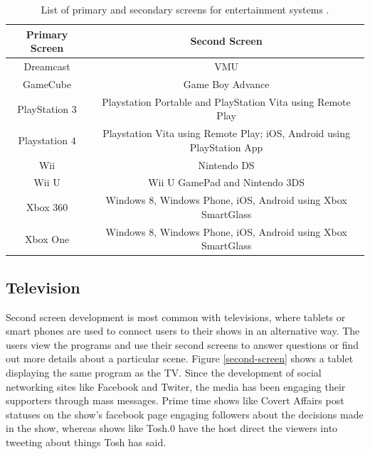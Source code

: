 \documentclass[11pt, oneside]{article}
\begin{document}
\begin{table}[h!]
    \centering
    \caption{List of primary and secondary screens for entertainment systems \cite{wiki_second_screen}.}
    \begin{tabular}{| c | c |}
        \hline
        Primary Screen & Second Screen \\ \hline
        Dreamcast & VMU \\ \hline
        GameCube & Game Boy Advance \\ \hline
        PlayStation 3 & Playstation Portable and PlayStation Vita using Remote Play \\ \hline
        Playstation 4 & Playstation Vita using Remote Play; iOS, Android using PlayStation App \\ \hline
        Wii & Nintendo DS \\ \hline
        Wii U & Wii U GamePad and Nintendo 3DS \\ \hline
        Xbox 360 & Windows 8, Windows Phone, iOS, Android using Xbox SmartGlass \\ \hline
        Xbox One & Windows 8, Windows Phone, iOS, Android using Xbox SmartGlass \\ \hline
    \end{tabular}
    \label{entertainment_table}
\end{table}

\subsection{Television} %
Second screen development is most common with televisions, where tablets or smart phones are used to connect users to their shows in an alternative way. The users view the programs and use their second screens to answer questions or find out more details about a particular scene. Figure \ref{second-screen} shows a tablet displaying the same program as the TV. Since the development of social networking sites like Facebook and Twiter, the media has been engaging their supporters through mass messages. Prime time shows like Covert Affairs post statuses on the show's facebook page engaging followers about the decisions made in the show, whereas shows like Tosh.0 have the host direct the viewers into tweeting about things Tosh has said. 
\end{document}
